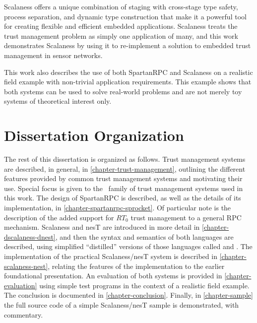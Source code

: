 Scalaness offers a unique combination of staging with cross-stage type safety, process
separation, and dynamic type construction that make it a powerful tool for creating flexible and
efficient embedded applications. Scalaness treats the trust management problem as simply one
application of many, and this work demonstrates Scalaness by using it to re-implement a solution
to embedded trust management in sensor networks.

This work also describes the use of both SpartanRPC and Scalaness on a realistic field example
with non-trivial application requirements. This example shows that both systems can be used to
solve real-world problems and are not merely toy systems of theoretical interest only.

\section{Dissertation Organization}

The rest of this dissertation is organized as follows. Trust management systems are described,
in general, in \autoref{chapter-trust-management}, outlining the different features provided by
common trust management systems and motivating their use. Special focus is given to the \RT\
family of trust management systems used in this work. The design of SpartanRPC is described, as
well as the details of its implementation, in \autoref{chapter-spartanrpc-sprocket}. Of
particular note is the description of the added support for $RT_0$ trust management to a general
RPC mechanism. Scalaness and nesT are introduced in more detail in
\autoref{chapter-dscalaness-dnest}, and then the syntax and semantics of both languages are
described, using simplified ``distilled'' versions of those languages called
\newterm{DScalaness} and \newterm{DnesT}. The implementation of the practical Scalaness/nesT
system is described in \autoref{chapter-scalaness-nest}, relating the features of the
implementation to the earlier foundational presentation. An evaluation of both systems is
provided in \autoref{chapter-evaluation} using simple test programs in the context of a
realistic field example. The conclusion is documented in \autoref{chapter-conclusion}. Finally,
in \autoref{chapter-sample} the full source code of a simple Scalaness/nesT sample is
demonstrated, with commentary.

